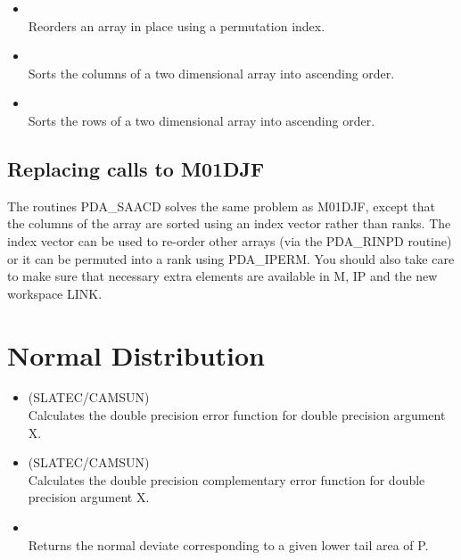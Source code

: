 \documentclass[11pt,twoside,nolof]{starlink}
\begin{document}
\begin{itemize}
\item {}\\
   Reorders an array in place using a permutation index.

\item {}\\
   Sorts the columns of a two dimensional array into ascending order.

\item {}\\
   Sorts the rows of a two dimensional array into ascending order.

\end{itemize}

\subsection{Replacing calls to M01DJF}

The routines PDA\_SAACD solves the same problem as M01DJF, except that
the columns of the array are sorted using an index vector rather than
ranks. The index vector can be used to re-order other arrays (via the
PDA\_RINPD routine) or it can be permuted into a rank using PDA\_IPERM.
You should also take care to make sure that necessary extra elements
are available in M, IP and the new workspace LINK.


\section{Normal Distribution}

\begin{itemize}

\item {} (SLATEC/CAMSUN)\\
   Calculates the double precision error function for double
   precision argument X.
\item {} (SLATEC/CAMSUN)\\
   Calculates the double precision complementary error function
   for double precision argument X.
\item {} \\
   Returns the normal deviate corresponding to a given lower
   tail area of P.
\end{itemize}
\end{document}
